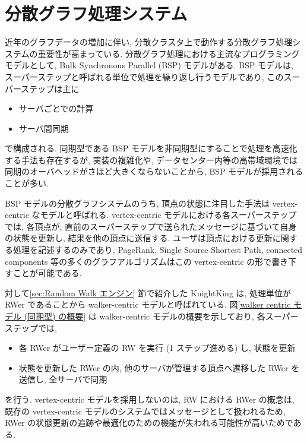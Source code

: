 \section{分散グラフ処理システム}\label{sec:分散グラフ処理システム}

近年のグラフデータの増加に伴い, 分散クラスタ上で動作する分散グラフ処理システムの重要性が高まっている. 分散グラフ処理における主流なプログラミングモデルとして, Bulk Synchronous Parallel (BSP) モデルがある. BSP モデルは, スーパーステップと呼ばれる単位で処理を繰り返し行うモデルであり, このスーパーステップは主に
\begin{itemize}
    \item サーバごとでの計算
    \item サーバ間同期
\end{itemize}
で構成される. 同期型である BSP モデルを非同期型にすることで処理を高速化する手法も存在する\cite{BAP}\cite{AAP}\cite{Gluon-Async}が, 実装の複雑化や, データセンター内等の高帯域環境では同期のオーバヘッドがさほど大きくならないことから, BSP モデルが採用されることが多い. 

BSP モデルの分散グラフシステムのうち, 頂点の状態に注目した手法\cite{Pregel}\cite{10.1145/2741948.2741970}\cite{10.5555/2387880.2387883}\cite{10.5555/3026877.3026901}\cite{Gluon}は vertex-centric なモデルと呼ばれる. vertex-centric モデルにおける各スーパーステップでは, 各頂点が, 直前のスーパーステップで送られたメッセージに基づいて自身の状態を更新し, 結果を他の頂点に送信する. ユーザは頂点における更新に関する処理を記述するのみであり, PageRank, Single Source Shortest Path, connected components 等の多くのグラフアルゴリズムはこの vertex-centric の形で書き下すことが可能である. 

対して\ref{sec:Random Walk エンジン} 節で紹介した KnightKing は, 処理単位が RWer であることから walker-centric モデルと呼ばれている. 図\ref{walker centric モデル (同期型) の概要} は walker-centric モデルの概要を示しており, 各スーパーステップでは, 
\begin{itemize}
    \item 各 RWer がユーザー定義の RW を実行 (1 ステップ進める) し, 状態を更新
    \item 状態を更新した RWer の内, 他のサーバが管理する頂点へ遷移した RWer を送信し, 全サーバで同期
\end{itemize}
を行う. vertex-centric モデルを採用しないのは, RW における RWer の概念は, 既存の vertex-centric モデルのシステムではメッセージとして扱われるため, RWer の状態更新の追跡や最適化のための機能が失われる可能性が高いためである. 

